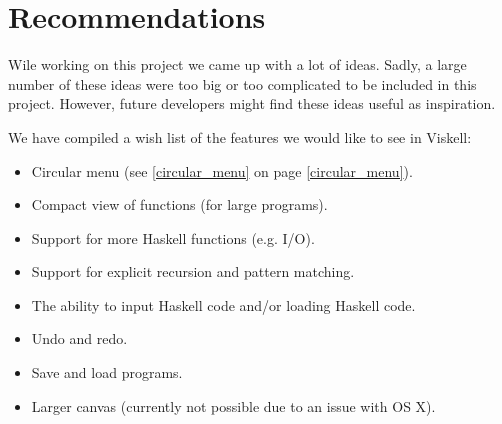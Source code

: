 \chapter{Recommendations}

Wile working on this project we came up with a lot of ideas.
Sadly, a large number of these ideas were too big or too complicated to be included in this project.
However, future developers might find these ideas useful as inspiration.

We have compiled a wish list of the features we would like to see in Viskell:

\begin{itemize}
	\item Circular menu (see \ref{circular_menu} on page \ref{circular_menu}).
	\item Compact view of functions (for large programs).
	\item Support for more Haskell functions (e.g. I/O).
	\item Support for explicit recursion and pattern matching.
	\item The ability to input Haskell code and/or loading Haskell code.
	\item Undo and redo.
	\item Save and load programs.
	\item Larger canvas (currently not possible due to an issue with OS X).
\end{itemize}
